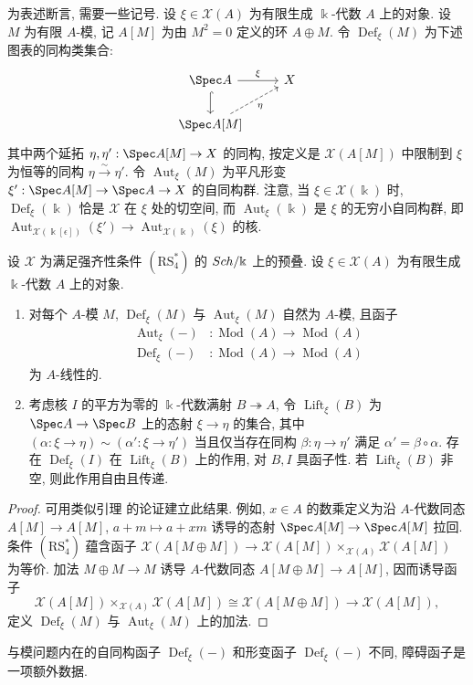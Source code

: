 为表述断言, 需要一些记号. 设 $\xi\in\mathcal X(A)$ 为有限生成 $\Bbbk$-代数 $A$ 上的对象. 设 $M$ 为有限 $A$-模, 记 $A[M]$ 为由 $M^2=0$ 定义的环 $A\oplus M$. 令 $\operatorname{Def}_{\xi}(M)$ 为下述图表的同构类集合:
\[
\begin{tikzcd}
\Spec A\arrow[r,"\xi"]\arrow[d,hook]&\mathcal X\\
\Spec A[M]\arrow[ur,dashed,"\eta"']&
\end{tikzcd}
\]
其中两个延拓 $\eta,\eta':\Spec A[M]\to\mathcal X$ 的同构, 按定义是 $\mathcal X(A[M])$ 中限制到 $\xi$ 为恒等的同构 $\eta\xrightarrow\sim\eta'$. 令 $\operatorname{Aut}_{\xi}(M)$ 为平凡形变 $\xi':\Spec A[M]\to\Spec A\to\mathcal X$ 的自同构群. 注意, 当 $\xi\in\mathcal X(\Bbbk)$ 时, $\operatorname{Def}_{\xi}(\Bbbk)$ 恰是 $\mathcal X$ 在 $\xi$ 处的切空间, 而 $\operatorname{Aut}_{\xi}(\Bbbk)$ 是 $\xi$ 的无穷小自同构群, 即 $\operatorname{Aut}_{\mathcal X(\Bbbk[\epsilon])}(\xi')\to\operatorname{Aut}_{\mathcal X(\Bbbk)}(\xi)$ 的核.
\begin{lemma}\label{src:C.7.3}
设 $\mathcal X$ 为满足强齐性条件 $(\mathrm{RS}_4^*)$ 的 $Sch/\Bbbk$ 上的预叠. 设 $\xi\in\mathcal X(A)$ 为有限生成 $\Bbbk$-代数 $A$ 上的对象.
\begin{enumerate}[(1)]
\item 对每个 $A$-模 $M$, $\operatorname{Def}_{\xi}(M)$ 与 $\operatorname{Aut}_{\xi}(M)$ 自然为 $A$-模, 且函子
\[
\begin{aligned}
\operatorname{Aut}_{\xi}(-)&:\operatorname{Mod}(A)\to\operatorname{Mod}(A)\\
\operatorname{Def}_{\xi}(-)&:\operatorname{Mod}(A)\to\operatorname{Mod}(A)
\end{aligned}
\]
为 $A$-线性的.
\item 考虑核 $I$ 的平方为零的 $\Bbbk$-代数满射 $B\twoheadrightarrow A$, 令 $\operatorname{Lift}_{\xi}(B)$ 为 $\Spec A\to\Spec B$ 上的态射 $\xi\to\eta$ 的集合, 其中 $(\alpha:\xi\to\eta)\sim(\alpha':\xi\to\eta')$ 当且仅当存在同构 $\beta:\eta\to\eta'$ 满足 $\alpha'=\beta\circ\alpha$. 存在 $\operatorname{Def}_{\xi}(I)$ 在 $\operatorname{Lift}_{\xi}(B)$ 上的作用, 对 $B,I$ 具函子性. 若 $\operatorname{Lift}_{\xi}(B)$ 非空, 则此作用自由且传递.
\end{enumerate}
\end{lemma}
\begin{proof}
可用类似引理  的论证建立此结果. 例如, $x\in A$ 的数乘定义为沿 $A$-代数同态 $A[M]\to A[M]$, $a+m\mapsto a+xm$ 诱导的态射 $\Spec A[M]\to\Spec A[M]$ 拉回. 条件 $(\mathrm{RS}_4^*)$ 蕴含函子 $\mathcal X(A[M\oplus M])\to\mathcal X(A[M])\times_{\mathcal X(A)}\mathcal X(A[M])$ 为等价. 加法 $M\oplus M\to M$ 诱导 $A$-代数同态 $A[M\oplus M]\to A[M]$, 因而诱导函子
\[
\mathcal X(A[M])\times_{\mathcal X(A)}\mathcal X(A[M])\cong\mathcal X(A[M\oplus M])\to\mathcal X(A[M]),
\]
定义 $\operatorname{Def}_{\xi}(M)$ 与 $\operatorname{Aut}_{\xi}(M)$ 上的加法.
\end{proof}
与模问题内在的自同构函子 $\operatorname{Def}_{\xi}(-)$ 和形变函子 $\operatorname{Def}_{\xi}(-)$ 不同, 障碍函子是一项额外数据.

